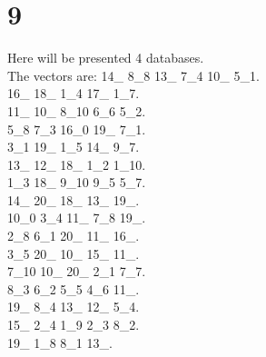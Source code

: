 \chapter{9}
\indent Here will be presented 4 databases.\\
The vectors are:
14\_ 8\_8 13\_ 7\_4 10\_ 5\_1.\\16\_ 18\_ 1\_4 17\_ 1\_7.\\11\_ 10\_ 8\_10 6\_6 5\_2.\\5\_8 7\_3 16\_0 19\_ 7\_1.\\3\_1 19\_ 1\_5 14\_ 9\_7.\\13\_ 12\_ 18\_ 1\_2 1\_10.\\1\_3 18\_ 9\_10 9\_5 5\_7.\\14\_ 20\_ 18\_ 13\_ 19\_.\\10\_0 3\_4 11\_ 7\_8 19\_.\\2\_8 6\_1 20\_ 11\_ 16\_.\\3\_5 20\_ 10\_ 15\_ 11\_.\\7\_10 10\_ 20\_ 2\_1 7\_7.\\8\_3 6\_2 5\_5 4\_6 11\_.\\19\_ 8\_4 13\_ 12\_ 5\_4.\\15\_ 2\_4 1\_9 2\_3 8\_2.\\19\_ 1\_8 8\_1 13\_.\\